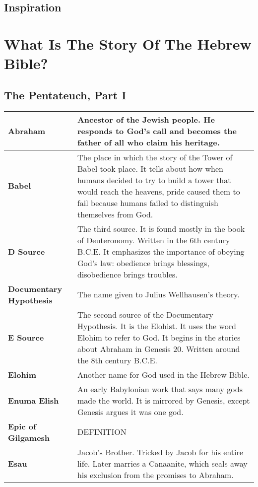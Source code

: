 \documentclass{report}
\begin{document}
    \chapter{Inspiration}

\part{What Is The Story Of The Hebrew Bible?}

    \chapter{The Pentateuch, Part I}
        \begin{center}
            \begin{longtable}{| p{5cm} | p{7cm} |}
                \hline
                \textbf{Abraham} & Ancestor of the Jewish people. He responds to God's call and becomes the father of all who claim his heritage.\\ \hline
                \textbf{Babel} & The place in which the story of the Tower of Babel took place. It tells about how when humans decided to try to build a tower that would reach the heavens, pride caused them to fail because humans failed to distinguish themselves from God.\\ \hline
                \textbf{D Source} & The third source. It is found mostly in the book of Deuteronomy. Written in the 6th century B.C.E. It emphasizes the importance of obeying God's law: obedience brings blessings, disobedience brings troubles.\\ \hline
                \textbf{Documentary Hypothesis} & The name given to Julius Wellhausen's theory.\\ \hline
                \textbf{E Source} & The second source of the Documentary Hypothesis. It is the Elohist. It uses the word Elohim to refer to God. It begins in the stories about Abraham in Genesis 20. Written around the 8th century B.C.E.\\ \hline
                \textbf{Elohim} & Another name for God used in the Hebrew Bible.\\ \hline
                \textbf{Enuma Elish} & An early Babylonian work that says many gods made the world. It is mirrored by Genesis, except Genesis argues it was one god.\\ \hline
                \textbf{Epic of Gilgamesh} & DEFINITION \\ \hline
                \textbf{Esau} & Jacob's Brother. Tricked by Jacob for his entire life. Later marries a Canaanite, which seals away his exclusion from the promises to Abraham.\\ \hline

\end{longtable}
\end{center}
\end{document}
